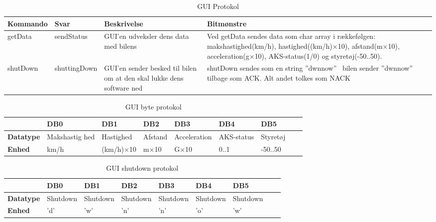\begin{table}[ht]
\begin{tabularx}{\textwidth}{| Z | Z | Z | Z |} \hline

\textbf{Kommando} 						&
\textbf{Svar}							&
\textbf{Beskrivelse}					&
\textbf{Bitmønstre}						\\ \hline

getData &

sendStatus &

GUI'en udveksler dens data med bilens &

Ved getData sendes data som char array i rækkefølgen: makshastighed(km/h), hastighed((km/h)$\times$10), afstand(m$\times$10), acceleration(g$\times$10), AKS-status(1/0) og styretøj(-50..50). \\ \hline



shutDown &

shuttingDown &

GUI'en sender besked til bilen om at den skal lukke dens software ned &

shutDown sendes som en string ''dwnnow'' \
bilen sender ''dwnnow'' tilbage som ACK. Alt andet tolkes som NACK \\ \hline

\end{tabularx}
\caption{GUI Protokol}
\label{tbl:prt_gui}
\end{table}



\begin{table}[ht]
\begin{tabularx}{\textwidth}{| Z | Z | Z | Z | Z | Z | Z | Z | Z |} \hline

\textbf{}	&
\textbf{DB0}	&
\textbf{DB1}	&
\textbf{DB2}	&
\textbf{DB3}	&
\textbf{DB4}	&
\textbf{DB5}	\\ \hline

\textbf{Datatype} & Makshastig hed & Hastighed & Afstand & Acceleration & AKS-status & Styretøj \\ \hline
\textbf{Enhed} & km/h & (km/h)$\times$10 & m$\times$10 & G$\times$10 & 0..1 & -50..50 \\ \hline

\end{tabularx}
\caption{GUI byte protokol}
\label{tbl:prt_gui_byte}
\end{table}

\begin{table}[ht]
\begin{tabularx}{\textwidth}{| Z | Z | Z | Z | Z | Z | Z | Z | Z |} \hline

\textbf{}	&
\textbf{DB0}	&
\textbf{DB1}	&
\textbf{DB2}	&
\textbf{DB3}	&
\textbf{DB4}	&
\textbf{DB5}	\\ \hline

\textbf{Datatype} & Shutdown & Shutdown & Shutdown & Shutdown & Shutdown & Shutdown \\ \hline
\textbf{Enhed} & 'd' & 'w' & 'n' & 'n' & 'o' & 'w' \\ \hline

\end{tabularx}
\caption{GUI shutdown protokol}
\label{tbl:prt_gui_shutdown}
\end{table}

